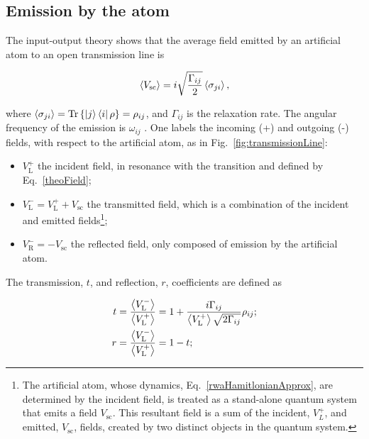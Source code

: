  \subsection{Emission by the atom\label{subsec:Scattering}}  
  The input-output theory \cite{zoller} shows that the average field emitted by an artificial atom to an open transmission line is
  
  \begin{equation}\label{theoEmission}
  	\left\langle V_{\text{sc}}\right\rangle =  i\sqrt{\frac{\Gamma_{ij}}{2}}\left\langle\sigma_{ji}\right\rangle,
  \end{equation}

  \noindent where $ \left\langle\sigma_{ji}\right\rangle=\text{Tr}\left\lbrace \ket{j}\bra{i}\rho \right\rbrace = \rho_{ij} $, and $ \Gamma_{ij} $ is the \lra{} relaxation rate. The angular frequency of the emission is $ \omega_{ij} $ \cite{UltimateOnChipQuantumAmplifier}. One labels the incoming (+) and outgoing (-) fields, with respect to the artificial atom, as in Fig.~\ref{fig:transmissionLine}:
  
  \begin{itemize}
  	\item $ V_{\text{L}}^{+} $ the incident field, in resonance with the \lra{} transition and defined by Eq.~\eqref{theoField};
  	\item $ V_{\text{L}}^{-} = V_{\text{L}}^{+}+V_{\text{sc}}$ the transmitted field, which is a combination of the incident and emitted fields\footnote{The artificial atom, whose dynamics, Eq.~\eqref{rwaHamitlonianApprox}, are determined by the incident field, is treated as a stand-alone quantum system that emits a field $ V_{\text{sc}} $. This resultant field is a sum of the incident, $V_{L}^{+} $, and emitted, $ V_{\text{sc}} $, fields, created by two distinct objects in the quantum system.};
  	\item $ V_{\text{R}}^{-} = - V_{\text{sc}}$ the reflected field, only composed of emission by the artificial atom.
  \end{itemize}

  The transmission, $ t $, and reflection, $ r $, coefficients are defined as
  
  \begin{equation}\label{theoRefTran}
  	\begin{aligned}
	  	t & = \frac{\left\langle V_{\text{L}}^{-}\right\rangle}{\left\langle V_{\text{L}}^{+}\right\rangle} = 1+\frac{i\Gamma_{ij}}{\left\langle V_{\text{L}}^{+}\right\rangle\sqrt{2\Gamma_{ij}}}\rho_{ij};\\
	  	r & = \frac{\left\langle V_{\text{L}}^{-}\right\rangle}{\left\langle V_{\text{L}}^{+}\right\rangle} = 1-t;
  	\end{aligned}
  \end{equation}
  
